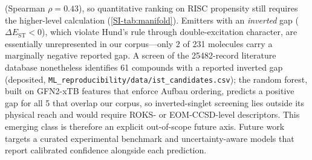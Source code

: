 (Spearman $\rho = 0.43$), so quantitative ranking on RISC propensity still requires the
higher-level calculation (\cref{SI-tab:manifold}). Emitters with an
\emph{inverted} gap ($\Delta E_\text{ST} < 0$), which violate Hund's rule through
double-excitation character,\cite{Veglianti2025} are essentially unrepresented in our
corpus---only \num{2} of \num{231} molecules carry a marginally negative reported gap.
A screen of the \num{25482}-record literature database nonetheless identifies \num{61}
compounds with a reported inverted gap (deposited, \texttt{ML\_reproducibility/data/ist\_candidates.csv});
the random forest, built on GFN2-xTB features
that enforce Aufbau ordering, predicts a positive gap for all \num{5} that overlap our
corpus, so inverted-singlet screening lies outside its physical reach and would require
ROKS- or EOM-CCSD-level descriptors.\cite{Salvi2025} This emerging class is therefore an
explicit out-of-scope future axis.
Future work targets a curated experimental benchmark and uncertainty-aware models
that report calibrated confidence alongside each prediction.
